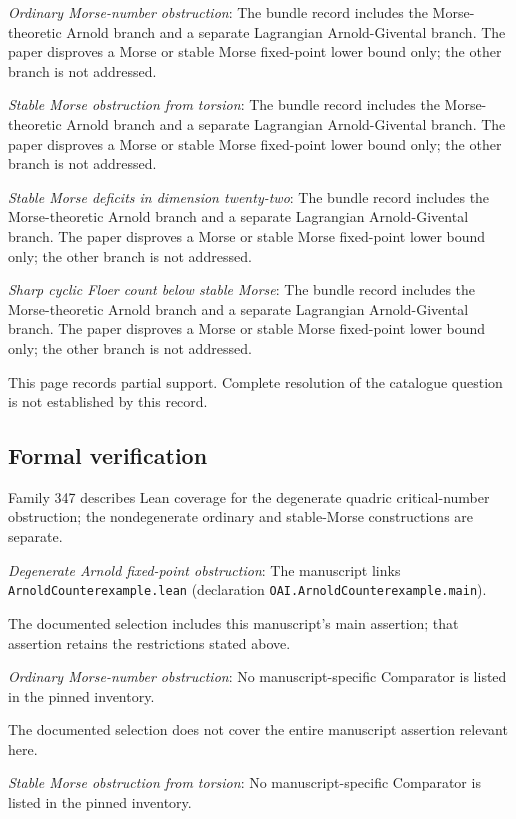 \documentclass[11pt]{article}
\begin{document}
\textit{Ordinary Morse-number obstruction}: The bundle record includes the Morse-theoretic Arnold branch and a separate Lagrangian Arnold-Givental branch. The paper disproves a Morse or stable Morse fixed-point lower bound only; the other branch is not addressed.

\textit{Stable Morse obstruction from torsion}: The bundle record includes the Morse-theoretic Arnold branch and a separate Lagrangian Arnold-Givental branch. The paper disproves a Morse or stable Morse fixed-point lower bound only; the other branch is not addressed.

\textit{Stable Morse deficits in dimension twenty-two}: The bundle record includes the Morse-theoretic Arnold branch and a separate Lagrangian Arnold-Givental branch. The paper disproves a Morse or stable Morse fixed-point lower bound only; the other branch is not addressed.

\textit{Sharp cyclic Floer count below stable Morse}: The bundle record includes the Morse-theoretic Arnold branch and a separate Lagrangian Arnold-Givental branch. The paper disproves a Morse or stable Morse fixed-point lower bound only; the other branch is not addressed.

This page records partial support. Complete resolution of the catalogue question is not established by this record.

\subsection{Formal verification}
Family 347 describes Lean coverage for the degenerate quadric critical-number obstruction; the nondegenerate ordinary and stable-Morse constructions are separate.

\textit{Degenerate Arnold fixed-point obstruction}: The manuscript links \texttt{ArnoldCounterexample.lean} (declaration \texttt{OAI.ArnoldCounterexample.main}).

The documented selection includes this manuscript’s main assertion; that assertion retains the restrictions stated above.

\textit{Ordinary Morse-number obstruction}: No manuscript-specific Comparator is listed in the pinned inventory.

The documented selection does not cover the entire manuscript assertion relevant here.

\textit{Stable Morse obstruction from torsion}: No manuscript-specific Comparator is listed in the pinned inventory.
\end{document}
